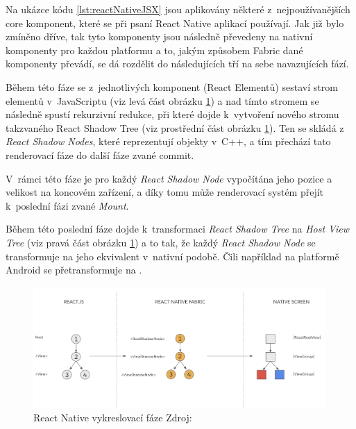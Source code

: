 Na ukázce kódu \ref{lst:reactNativeJSX} jsou aplikovány některé z~nejpoužívanějších core komponent, které se při psaní React
Native aplikací používají. \cite{reactNativeComponents} Jak již bylo zmíněno dříve, tak tyto komponenty jsou následně převedeny 
na nativní komponenty pro každou platformu a to, jakým způsobem Fabric dané komponenty převádí, se dá rozdělit do následujících tří
na sebe navazujících fází. \cite{reactNativeRenderCommitMount}
 

\smallskip

Během této fáze se z~jednotlivých komponent (React Elementů) sestaví strom elementů v~JavaScriptu (viz levá část obrázku \ref{fig:react-native-render-pipeline}) a nad tímto stromem se 
následně spustí rekurzivní redukce, při které dojde k~vytvoření nového stromu takzvaného React Shadow Tree (viz prostřední část obrázku \ref{fig:react-native-render-pipeline}).
\cite{reactNativeRenderCommitMount} Ten se skládá z \textit{React Shadow Nodes}, které reprezentují objekty v~C++, a tím přechází tato renderovací fáze do další fáze zvané commit.\cite{reactNativeRenderCommitMount}

V~rámci této fáze je pro každý \textit{React Shadow Node} vypočítána jeho pozice a velikost na koncovém zařízení, a díky tomu může renderovací systém
přejít k~poslední fázi zvané \textit{Mount}. \cite{reactNativeRenderCommitMount}

Během této poslední fáze dojde k~transformaci \textit{React Shadow Tree} na \textit{Host View Tree} (viz pravá část obrázku \ref{fig:react-native-render-pipeline}) a to tak, že každý \textit{React Shadow Node}
se transformuje na jeho ekvivalent v~nativní podobě. \cite{reactNativeRenderCommitMount} Čili například na platformě Android se  přetransformuje na . \cite{reactNativeRenderCommitMount}

\begin{figure}[H]
  \centering
  \includegraphics[width=0.99\textwidth]{react-native-render-pipeline.png}
  \caption{React Native vykreslovací fáze Zdroj: \cite{reactNativeRenderCommitMount}}
  \label{fig:react-native-render-pipeline}
\end{figure}

